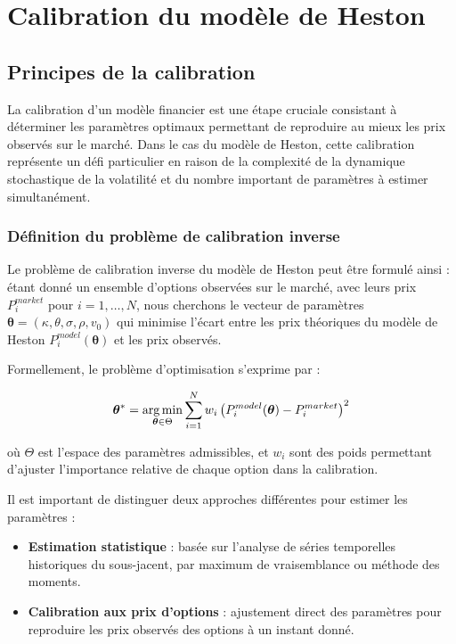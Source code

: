 \chapter{Calibration du modèle de Heston}
\label{chap:calibration_heston}

\section{Principes de la calibration}

La calibration d'un modèle financier est une étape cruciale consistant à déterminer les paramètres optimaux permettant de reproduire au mieux les prix observés sur le marché. Dans le cas du modèle de Heston, cette calibration représente un défi particulier en raison de la complexité de la dynamique stochastique de la volatilité et du nombre important de paramètres à estimer simultanément.

\subsection{Définition du problème de calibration inverse}

Le problème de calibration inverse du modèle de Heston peut être formulé ainsi : étant donné un ensemble d'options observées sur le marché, avec leurs prix $P^{market}_i$ pour $i = 1, \ldots, N$, nous cherchons le vecteur de paramètres $\boldsymbol{\theta} = (\kappa, \theta, \sigma, \rho, v_0)$ qui minimise l'écart entre les prix théoriques du modèle de Heston $P^{model}_i(\boldsymbol{\theta})$ et les prix observés.

Formellement, le problème d'optimisation s'exprime par :

\begin{equation}
	\boldsymbol{\theta}^* = \operatorname*{arg\,min}_{\boldsymbol{\theta} \in \Theta} \sum_{i=1}^{N} w_i \left( P^{model}_i(\boldsymbol{\theta}) - P^{market}_i \right)^2
\end{equation}

où $\Theta$ est l'espace des paramètres admissibles, et $w_i$ sont des poids permettant d'ajuster l'importance relative de chaque option dans la calibration.

Il est important de distinguer deux approches différentes pour estimer les paramètres :

\begin{itemize}
	\item \textbf{Estimation statistique} : basée sur l'analyse de séries temporelles historiques du sous-jacent, par maximum de vraisemblance ou méthode des moments.
	\item \textbf{Calibration aux prix d'options} : ajustement direct des paramètres pour reproduire les prix observés des options à un instant donné.
\end{itemize}

